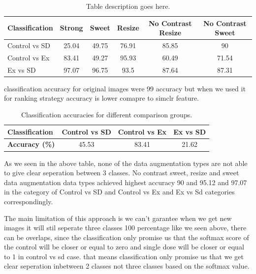 \begin{table}[H]
  \centering
  \begin{tabular}{@{}lccccc@{}}
  \toprule
  \textbf{Classification} & \textbf{Strong} & \textbf{Sweet} & \textbf{Resize} & \textbf{No Contrast Resize} & \textbf{No Contrast Sweet} \\ \midrule
  Control vs SD             & 25.04            & 49.75           & 76.91          & 85.85                         & 90                        \\
  Control vs Ex             & 83.41            & 49.27               & 95.93           & 60.49                          &    71.54                 \\
  Ex vs SD                & 97.07           & 96.75          & 93.5           & 87.64                       & 87.31                        \\ \bottomrule
  \end{tabular}
  \caption{Table description goes here.}
  \label{tab:ranking softmax}
\end{table}
classification accuracy for original images were 99 accuracy but when we used it for ranking strategy accuracy is lower comapre to simclr feature.
\begin{table}[H]
  \centering
  \begin{tabular}{@{}lccc@{}}
  \toprule
  \textbf{Classification}     & \textbf{Control vs SD} & \textbf{Control vs Ex} & \textbf{Ex vs SD} \\ \midrule
  \textbf{Accuracy (\%)}      & 45.53                  & 83.41                  & 21.62             \\ \bottomrule
  \end{tabular}
  \caption{Classification accuracies for different comparison groups.}
  \label{tab:classification_accuracies}
  \end{table}
  
As we seen in the above table, none of the  data augmentation types are not able to give clear seperation between 3 classes. No contrast sweet, resize and sweet data augmentation data types achieved highest accuracy 90 and 95.12 and 97.07  in the category of  Control vs SD and Control vs Ex and Ex vs Sd categories correspondingly. 

The main limitation of this approach is we can't garantee when we get new images it will stil seperate three classes 100 percentage like we seen above, there can be overlaps, since the classification only promise us that the softmax score of the control will be closer or equal to zero and  single dose will be closer or equal to 1 in control vs sd case. that means classification only promise us that we get clear seperation inbetween 2 classes not three classes based on the softmax value.



